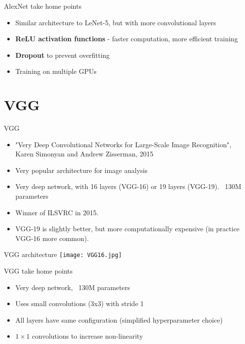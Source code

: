 \documentclass[9pt, aspectratio=169]{beamer}
\begin{document}
\begin{frame}
    {AlexNet take home points}
    \begin{itemize}
        \item Similar architecture to LeNet-5, but with more convolutional layers
        \item \textbf{ReLU activation functions} - faster computation, more efficient training
        \item \textbf{Dropout} to prevent overfitting
        \item Training on multiple GPUs
    \end{itemize}
\end{frame}

\section{VGG}

\begin{frame}
    {VGG}
    \begin{itemize}
        \item "Very Deep Convolutional Networks for Large-Scale Image Recognition", Karen Simonyan and Andrew Zisserman, 2015
        \item Very popular architecture for image analysis
        \item Very deep network, with 16 layers (VGG-16) or 19 layers (VGG-19). ~130M parameters
        \item Winner of ILSVRC in 2015.
        \item VGG-19 is slightly better, but more computationally expensive (in practice VGG-16 more common).
    \end{itemize}
\end{frame}

\begin{frame}
    {VGG architecture}
    \centering
    \texttt{[image: VGG16.jpg]}
\end{frame}

\begin{frame}
    {VGG take home points}
    \begin{itemize}
        \item Very deep network, ~130M parameters
        \item Uses small convolutions (3x3) with stride 1
        \item All layers have same configuration (simplified hyperparameter choice)
        \item $1\times 1$ convolutions to increase non-linearity
    \end{itemize}
\end{frame}
\end{document}
